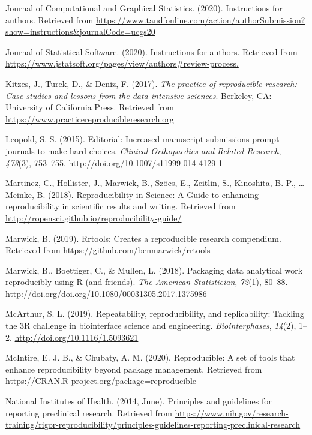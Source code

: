 \documentclass[12pt,twoside]{reedthesis}
\begin{document}
\hypertarget{ref-jcgs-guide}{}
Journal of Computational and Graphical Statistics. (2020). Instructions
for authors. Retrieved from
\url{https://www.tandfonline.com/action/authorSubmission?show=instructions\&journalCode=ucgs20}

\hypertarget{ref-jss-guide}{}
Journal of Statistical Software. (2020). Instructions for authors.
Retrieved from
\url{https://www.jstatsoft.org/pages/view/authors\#review-process.}

\hypertarget{ref-kitzes2017practice}{}
Kitzes, J., Turek, D., \& Deniz, F. (2017). \emph{The practice of
reproducible research: Case studies and lessons from the data-intensive
sciences}. Berkeley, CA: University of California Press. Retrieved from
\url{https://www.practicereproducibleresearch.org}

\hypertarget{ref-leopold2015increased}{}
Leopold, S. S. (2015). Editorial: Increased manuscript submissions
prompt journals to make hard choices. \emph{Clinical Orthopaedics and
Related Research}, \emph{473}(3), 753--755.
\url{http://doi.org/10.1007/s11999-014-4129-1}

\hypertarget{ref-r-opensci}{}
Martinez, C., Hollister, J., Marwick, B., Szöcs, E., Zeitlin, S.,
Kinoshita, B. P., \ldots{} Meinke, B. (2018). Reproducibility in
Science: A Guide to enhancing reproducibility in scientific results and
writing. Retrieved from
\url{http://ropensci.github.io/reproducibility-guide/}

\hypertarget{ref-R-rrtools}{}
Marwick, B. (2019). Rrtools: Creates a reproducible research compendium.
Retrieved from \url{https://github.com/benmarwick/rrtools}

\hypertarget{ref-marwick2018packaging}{}
Marwick, B., Boettiger, C., \& Mullen, L. (2018). Packaging data
analytical work reproducibly using R (and friends). \emph{The American
Statistician}, \emph{72}(1), 80--88.
\url{http://doi.org/doi.org/10.1080/00031305.2017.1375986}

\hypertarget{ref-engineering-reproducibility}{}
McArthur, S. L. (2019). Repeatability, reproducibility, and
replicability: Tackling the 3R challenge in biointerface science and
engineering. \emph{Biointerphases}, \emph{14}(2), 1--2.
\url{http://doi.org/10.1116/1.5093621}

\hypertarget{ref-R-reproducible}{}
McIntire, E. J. B., \& Chubaty, A. M. (2020). Reproducible: A set of
tools that enhance reproducibility beyond package management. Retrieved
from \url{https://CRAN.R-project.org/package=reproducible}

\hypertarget{ref-bio-principles}{}
National Institutes of Health. (2014, June). Principles and guidelines
for reporting preclinical research. Retrieved from
\url{https://www.nih.gov/research-training/rigor-reproducibility/principles-guidelines-reporting-preclinical-research}
\end{document}
